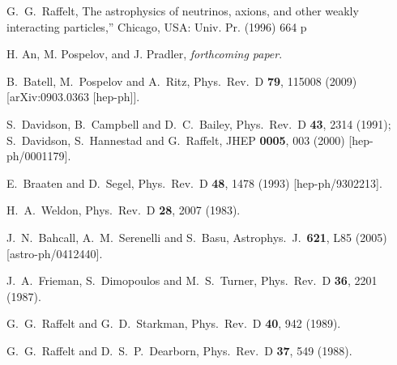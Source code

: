 \documentclass[12pt]{article}
\begin{document}
\begin{thebibliography}{99}
  G.~G.~Raffelt,
The astrophysics of neutrinos, axions, and other weakly interacting particles,''
  Chicago, USA: Univ. Pr. (1996) 664 p

 H. An, M. Pospelov, and J. Pradler, {\em forthcoming paper}.

  B.~Batell, M.~Pospelov and A.~Ritz,
  Phys.\ Rev.\ D {\bf 79}, 115008 (2009)
  [arXiv:0903.0363 [hep-ph]].

  S.~Davidson, B.~Campbell and D.~C.~Bailey,
  Phys.\ Rev.\ D {\bf 43}, 2314 (1991);
  S.~Davidson, S.~Hannestad and G.~Raffelt,
  JHEP {\bf 0005}, 003 (2000)
  [hep-ph/0001179].

  E.~Braaten and D.~Segel,
  Phys.\ Rev.\ D {\bf 48}, 1478 (1993)
  [hep-ph/9302213].




  
  H.~A.~Weldon,
  Phys.\ Rev.\ D {\bf 28}, 2007 (1983).
  
  J.~N.~Bahcall, A.~M.~Serenelli and S.~Basu,
  Astrophys.\ J.\  {\bf 621}, L85 (2005)
  [astro-ph/0412440].
  
  J.~A.~Frieman, S.~Dimopoulos and M.~S.~Turner,
  Phys.\ Rev.\ D {\bf 36}, 2201 (1987).
  
  G.~G.~Raffelt and G.~D.~Starkman,
  Phys.\ Rev.\ D {\bf 40}, 942 (1989).

  G.~G.~Raffelt and D.~S.~P.~Dearborn,
  Phys.\ Rev.\ D {\bf 37}, 549 (1988).
  

\end{thebibliography}
\end{document}
